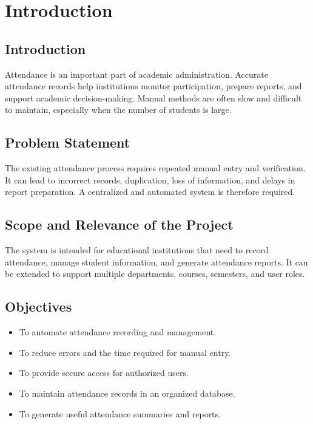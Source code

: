 \documentclass[12pt,a4paper]{report}
\begin{document}
\chapter{Introduction}

\section{Introduction}
Attendance is an important part of academic administration. Accurate attendance records help institutions monitor participation, prepare reports, and support academic decision-making. Manual methods are often slow and difficult to maintain, especially when the number of students is large.

\section{Problem Statement}
The existing attendance process requires repeated manual entry and verification. It can lead to incorrect records, duplication, loss of information, and delays in report preparation. A centralized and automated system is therefore required.

\section{Scope and Relevance of the Project}
The system is intended for educational institutions that need to record attendance, manage student information, and generate attendance reports. It can be extended to support multiple departments, courses, semesters, and user roles.

\section{Objectives}
\begin{itemize}
  \item To automate attendance recording and management.
  \item To reduce errors and the time required for manual entry.
  \item To provide secure access for authorized users.
  \item To maintain attendance records in an organized database.
  \item To generate useful attendance summaries and reports.
\end{itemize}
\end{document}
